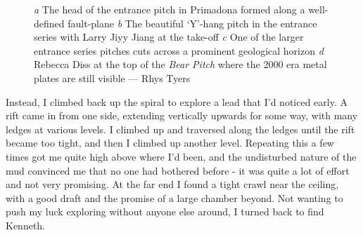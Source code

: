 \begin{figure}[b!]
    \checkoddpage \ifoddpage \forcerectofloat \else \forceversofloat \fi
    \centering
    \begin{subfigure}[t]{0.685\textwidth}
        \centering
        \caption{} \label{Traverse over buckwheat}
    \end{subfigure}
        \hfill
    \begin{subfigure}[t]{0.305\textwidth}
        \centering
         \caption{}\label{passage in Deja VU}
    \end{subfigure}
    \vspace{0cm}

    \begin{subfigure}[t]{0.397\textwidth}
        \centering
        \caption{} \label{Dejavu}
    \end{subfigure}
        \hfill
    \begin{subfigure}[t]{0.593\textwidth}
        \centering   
        \caption{} \label{Dejavu}
    \end{subfigure}

    \caption{
        \emph{a} The head of the entrance pitch in Primadona formed along a well-defined fault-plane
        \emph{b} The beautiful ‘Y'-hang pitch in the entrance series with Larry Jiyy Jiang at the take-off
        \emph{c} One of the larger entrance series pitches cuts across a prominent geological horizon
        \emph{d} Rebecca Diss at the top of the \emph{Bear Pitch} where the 2000 era metal plates are still visible --- Rhys Tyers }
\end{figure}

Instead, I climbed back up the spiral to explore a lead that I’d noticed early. A rift came in from one side, extending vertically upwards for some way, with many ledges at various levels. I climbed up and traversed along the ledges until the rift became too tight, and then I climbed up another level. Repeating this a few times got me quite high above where I’d been, and the undisturbed nature of the mud convinced me that no one had bothered before - it was quite a lot of effort and not very promising. At the far end I found a tight crawl near the ceiling, with a good draft and the promise of a large chamber beyond. Not wanting to push my luck exploring without anyone else around, I turned back to find Kenneth.

